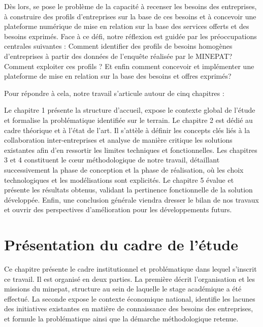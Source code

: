 \documentclass[12pt, a4paper, oneside]{report}
\begin{document}
Dès lors, se pose le problème de la capacité à recenser les besoins des entreprises, à construire des profils d'entreprises sur la base de ces besoins et à concevoir une plateforme numérique de mise en relation sur la base des services offerts et des besoins exprimés. Face à ce défi, notre réflexion est guidée par les préoccupations centrales suivantes : Comment identifier des profils de besoins homogènes d'entreprises à partir des données de l'enqu\^ete réalisée par le MINEPAT? Comment exploiter ces profils ? Et enfin comment concevoir et implémenter une plateforme de mise en relation sur la base des besoins et offres exprimés?

Pour répondre à cela, notre travail s'articule autour de cinq chapitres :

Le chapitre 1 présente la structure d'accueil, expose le contexte global de l'étude et formalise la problématique identifiée sur le terrain. Le chapitre 2 est dédié au cadre théorique et à l'état de l'art. Il s'attèle à définir les concepts clés liés à la collaboration inter-entreprises et analyse de manière critique les solutions existantes afin d'en ressortir les limites techniques et fonctionnelles. Les chapitres 3 et 4 constituent le cœur méthodologique de notre travail, détaillant successivement la phase de conception et la phase de réalisation, où les choix technologiques et les modélisations sont explicités. Le chapitre 5 évalue et présente les résultats obtenus, validant la pertinence fonctionnelle de la solution développée. Enfin, une conclusion générale viendra dresser le bilan de nos travaux et ouvrir des perspectives d'amélioration pour les développements futurs.

	\chapter{Présentation du cadre de l'étude}
	\label{chap:structure}
Ce chapitre pr\'esente le cadre institutionnel et probl\'ematique
dans lequel s'inscrit ce travail. Il est organis\'e en deux parties.
La premi\`ere d\'ecrit l'organisation et les missions du \gls{minepat},
structure au sein de laquelle le stage acad\'emique a \'et\'e
effectu\'e. La seconde expose le contexte \'economique national,
identifie les lacunes des initiatives existantes en mati\`ere de
connaissance des besoins des entreprises, et formule la
probl\'ematique ainsi que la d\'emarche m\'ethodologique retenue.
\end{document}

